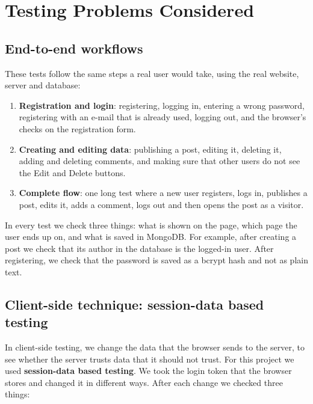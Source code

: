 \documentclass[12pt,a4paper,oneside]{report}
\begin{document}
\chapter{Testing Problems Considered}\label{ch:problems}

\section{End-to-end workflows}

These tests follow the same steps a real user would take, using the real
website, server and database:

\begin{enumerate}[nosep]
  \item \textbf{Registration and login}: registering, logging in, entering a
        wrong password, registering with an e-mail that is already used,
        logging out, and the browser's checks on the registration form.
  \item \textbf{Creating and editing data}: publishing a post, editing it,
        deleting it, adding and deleting comments, and making sure that other
        users do not see the Edit and Delete buttons.
  \item \textbf{Complete flow}: one long test where a new user registers, logs
        in, publishes a post, edits it, adds a comment, logs out and then opens
        the post as a visitor.
\end{enumerate}

In every test we check three things: what is shown on the page, which page
the user ends up on, and what is saved in MongoDB. For example, after creating
a post we check that its author in the database is the logged-in user. After
registering, we check that the password is saved as a bcrypt hash and not as
plain text.

\section{Client-side technique: session-data based testing}

In client-side testing, we change the data that the browser sends to the
server, to see whether the server trusts data that it should not trust. For
this project we used \textbf{session-data based testing}. We took the login
token that the browser stores and changed it in different ways. After each
change we checked three things:
\end{document}
